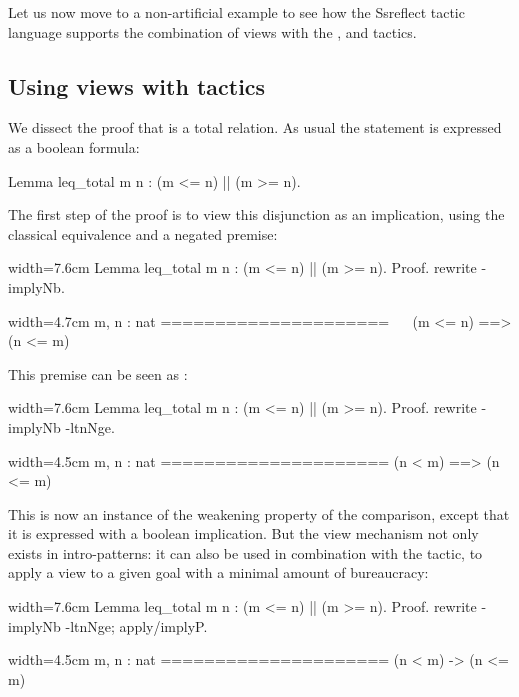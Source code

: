 Let us now move to a non-artificial example to see how the Ssreflect
tactic language supports the combination of views with the ,
 and  tactics.

\subsection{Using views with tactics}\label{sec:viewtac}

We dissect the proof that \C{<=} is a total relation.
As usual the statement is expressed as a boolean formula:

\begin{coq}{}{}
Lemma leq_total m n : (m <= n) || (m >= n).
\end{coq}

The first step of the proof is to view this disjunction as an
implication, using the classical equivalence and a negated premise:

\begin{coq}{}{width=7.6cm}
Lemma leq_total m n : (m <= n) || (m >= n).
Proof.
rewrite -implyNb.
\end{coq}
\begin{coqout}{}{width=4.7cm}
m, n : nat
=====================
~~ (m <= n) ==> (n <= m)
\end{coqout}

This premise can be seen as :

\begin{coq}{}{width=7.6cm}
Lemma leq_total m n : (m <= n) || (m >= n).
Proof.
rewrite -implyNb -ltnNge.
\end{coq}
\begin{coqout}{}{width=4.5cm}
m, n : nat
=====================
(n < m) ==> (n <= m)
\end{coqout}

This is now an instance of the weakening property of the comparison,
except that it is expressed with a boolean implication. But the view
mechanism not only exists in intro-patterns: it can also be used in
combination with the  tactic, to apply a view to a given goal
with a minimal amount of bureaucracy:

\begin{coq}{}{width=7.6cm}
Lemma leq_total m n : (m <= n) || (m >= n).
Proof.
rewrite -implyNb -ltnNge; apply/implyP.
\end{coq}
\begin{coqout}{}{width=4.5cm}
m, n : nat
=====================
(n < m) -> (n <= m)
\end{coqout}

